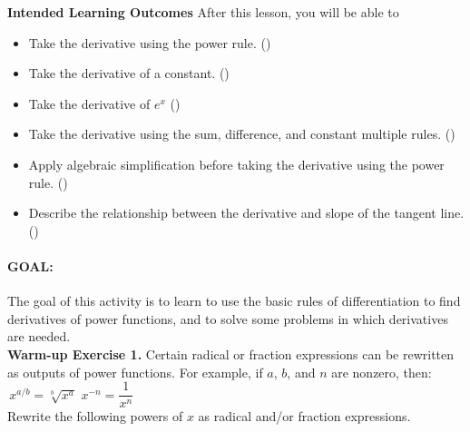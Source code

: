 \documentclass[10pt]{article}
\begin{document}
\pagestyle{otherpages}
\thispagestyle{firstpage}

\textbf{Intended Learning Outcomes}
After this lesson, you will be able to 

\begin{itemize}
    \item Take the derivative using the power rule. ()
    \item Take the derivative of a constant. ()
    \item Take the derivative of $e^x$ ()
    \item Take the derivative using the sum, difference, and constant multiple rules. ()
    \item Apply algebraic simplification before taking the derivative using the power rule. ()
    \item Describe the relationship between the derivative and slope of the tangent line.()
\end{itemize}

\vspace{-0.5cm}

\hrulefill

\paragraph*{GOAL:} The goal of this activity is to learn to use the basic rules of differentiation to find derivatives of power functions, and to solve some problems in which derivatives are needed.\\

{\bf\color{blue} Warm-up Exercise 1.} Certain radical or fraction expressions can be rewritten as outputs of power functions. For example, if $a$, $b$, and $n$ are nonzero, then:\\

\,\hfill $x^{a/b} = \sqrt[b]{x^a}$ \hfill $x^{-n} = \dfrac{1}{x^n}$ \hfill\,\\

Rewrite the following powers of $x$ as radical and/or fraction expressions.
\end{document}

